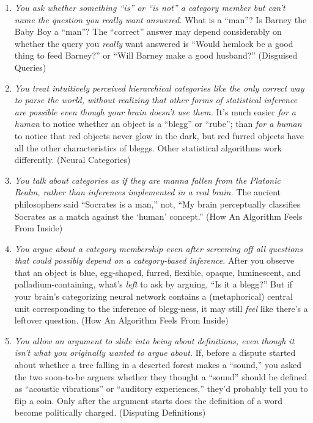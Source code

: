 {\begin{enumerate}
\item {
 \textit{You ask whether something
``is'' or ``is
not'' a category member but can't
name the question you really want answered.} What is a
``man''? Is Barney the Baby Boy a
``man''? The
``correct'' answer may depend
considerably on whether the query you \textit{really} want answered is
``Would hemlock be a good thing to feed
Barney?'' or ``Will Barney make a
good husband?'' (Disguised Queries)}

\item {
 \textit{You treat intuitively perceived hierarchical categories
like the only correct way to parse the world, without realizing that
other forms of statistical inference are possible even though your
brain doesn't use them.} It's much
easier \textit{for a human} to notice whether an object is a
``blegg'' or
``rube''; than \textit{for a human}
to notice that red objects never glow in the dark, but red furred
objects have all the other characteristics of bleggs. Other statistical
algorithms work differently. (Neural Categories)}

\item {
 \textit{You talk about categories as if they are manna fallen from
the Platonic Realm, rather than inferences implemented in a real
brain.} The ancient philosophers said ``Socrates is a
man,'' not, ``My brain perceptually
classifies Socrates as a match against the
`human' concept.''
(How An Algorithm Feels From Inside)}

\item {
 \textit{You argue about a category membership even after screening
off all questions that could possibly depend on a category-based
inference.} After you observe that an object is blue, egg-shaped,
furred, flexible, opaque, luminescent, and palladium-containing,
what's \textit{left} to ask by arguing,
``Is it a blegg?'' But if your
brain's categorizing neural network contains a
(metaphorical) central unit corresponding to the inference of
blegg-ness, it may still \textit{feel} like there's a
leftover question. (How An Algorithm Feels From Inside)}

\item {
 \textit{You allow an argument to slide into being about
definitions, even though it isn't what you originally
wanted to argue about.} If, before a dispute started about whether a
tree falling in a deserted forest makes a
``sound,'' you asked the two
soon-to-be arguers whether they thought a
``sound'' should be defined as
``acoustic vibrations'' or
``auditory experiences,''
they'd probably tell you to flip a coin. Only after the
argument starts does the definition of a word become politically
charged. (Disputing Definitions)}


\end{enumerate}}
